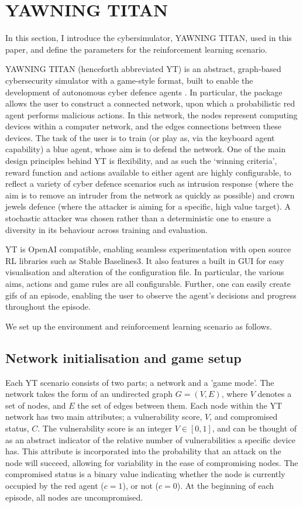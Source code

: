 \documentclass{article}
\begin{document}
\section{YAWNING TITAN}
In this section, I introduce the cybersimulator, YAWNING TITAN, used in this paper, and define the parameters for the reinforcement learning scenario.

YAWNING TITAN (henceforth abbreviated YT)  is an abstract, graph-based cybersecurity simulator with a game-style format, built to enable the development of autonomous cyber defence agents \cite{YT}. In particular, the package allows the user to construct a connected network, upon which a probabilistic red agent performs malicious actions. In this network, the nodes represent computing devices within a computer network, and the edges connections between these devices. The task of the user is to train (or play as, via the keyboard agent capability) a blue agent, whose aim is to defend the network. One of the main design principles behind YT is flexibility, and as such the ‘winning criteria’, reward function and actions available to either agent are highly configurable, to reflect a variety of cyber defence scenarios such as intrusion response (where the aim is to remove an intruder from the network as quickly as possible) and crown jewels defence (where the attacker is aiming for a specific, high value target). A stochastic attacker was chosen rather than a deterministic one to ensure a diversity in its behaviour across training and evaluation.


YT is OpenAI compatible, enabling seamless experimentation with open source RL libraries such as Stable Baselines3. It also features a built in GUI for easy visualisation and alteration of the configuration file. In particular, the various aims, actions and game rules are all configurable. Further, one can easily create gifs of an episode, enabling the user to observe the agent's decisions and progress throughout the episode.  

We set up the environment and reinforcement learning scenario as follows. 

\subsection{Network initialisation and game setup}

Each YT scenario consists of two parts; a network and a 'game mode'. The network takes the form of an undirected graph $G = (V,E)$, where $V$ denotes a set of nodes, and $E$ the set of edges between them. Each node within the YT network has two main attributes; a vulnerability score, $V$, and compromised status, $C$. The vulnerability score is an integer $V \in [0,1]$, and can be thought of as an abstract indicator of the relative number of vulnerabilities a specific device has. This attribute is incorporated into the probability that an attack on the node will succeed, allowing for variability in the ease of compromising nodes. The compromised status is a binary value indicating whether the node is currently occupied by the red agent ($c=1$), or not ($c=0$). At the beginning of each episode, all nodes are uncompromised.
\end{document}
